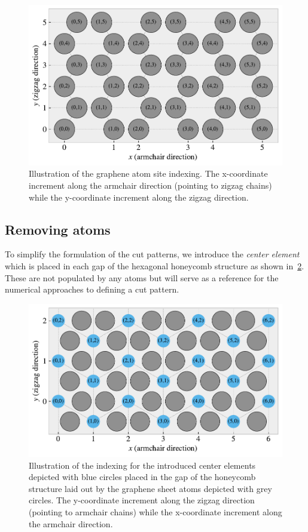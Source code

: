 \begin{figure}[!htb]
  \centering
  \includegraphics[width=0.7\linewidth]{figures/system/atom_indexing.pdf}
  \caption{Illustration of the graphene atom site indexing. The x-coordinate increment along the armchair direction (pointing to zigzag chains) while the y-coordinate increment along the zigzag direction.}
  \label{fig:atom_indexing}
\end{figure}


\subsection{Removing atoms}
To simplify the formulation of the cut patterns, we introduce the \textit{center element} which is placed in each gap of the hexagonal honeycomb structure as shown in~\cref{fig:center_indexing}. These are not populated by any atoms but will serve as a reference for the numerical approaches to defining a cut pattern.

\begin{figure}[!htb]
  \centering
  \includegraphics[width=0.7\linewidth]{figures/system/center_indexing.pdf}
  \caption{Illustration of the indexing for the introduced center elements depicted with blue circles placed in the gap of the honeycomb structure laid out by the graphene sheet atoms depicted with grey circles. The y-coordinate increment along the zigzag direction (pointing to armchair chains) while the x-coordinate increment along the armchair direction.}
  \label{fig:center_indexing}
\end{figure}

